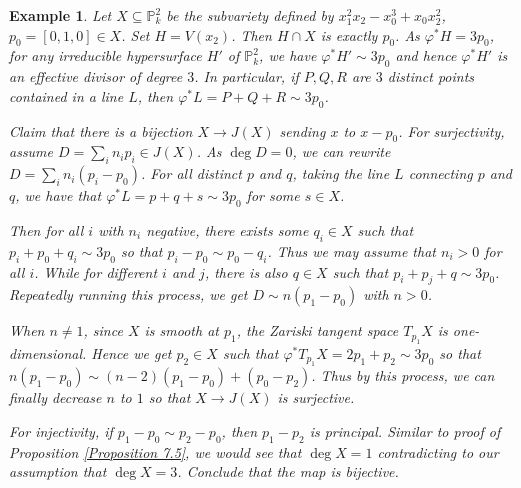 \documentclass{ctexart}
\newtheorem{example}{Example}[section]
\begin{document}
\begin{example}
    Let $X \subseteq \mathbb{P}_{k}^{2}$ be the subvariety defined by $x_{1}^{2}x_{2} - x_{0}^{3} + x_{0}x_{2}^{2}$, $p_{0} = [0, 1, 0]\in X$.
    Set $H = V(x_{2})$.
    Then $H \cap X$ is exactly $p_{0}$.
    As $\varphi^{\ast}H = 3p_{0}$, for any irreducible hypersurface $H'$ of $\mathbb{P}_{k}^{2}$, we have $\varphi^{\ast}H' \sim 3p_{0}$ and hence $\varphi^{\ast}H'$ is an effective divisor of degree $3$.
    In particular, if $P, Q, R$ are $3$ distinct points contained in a line $L$, then $\varphi^{\ast}L = P + Q + R \sim 3p_{0}$.
    \par
    Claim that there is a bijection $X \rightarrow J(X)$ sending $x$ to $x - p_{0}$.
    For surjectivity, assume $D = \sum_{i} n_{i}p_{i}\in J(X)$.
    As $\deg D = 0$, we can rewrite $D = \sum_{i} n_{i}(p_{i} - p_{0})$.
    For all distinct $p$ and $q$, taking the line $L$ connecting $p$ and $q$, we have that $\varphi^{\ast}L = p + q + s \sim 3p_{0}$ for some $s\in X$.
    \par
    Then for all $i$ with $n_{i}$ negative, there exists some $q_{i}\in X$ such that $p_{i} + p_{0} + q_{i} \sim 3p_{0}$ so that $p_{i} - p_{0} \sim p_{0} - q_{i}$.
    Thus we may assume that $n_{i} > 0$ for all $i$.
    While for different $i$ and $j$, there is also $q\in X$ such that $p_{i} + p_{j} + q \sim 3p_{0}$.
    Repeatedly running this process, we get $D \sim n(p_{1} - p_{0})$ with $n > 0$.
    \par
    When $n \neq 1$, since $X$ is smooth at $p_{1}$, the Zariski tangent space $T_{p_{1}}X$ is one-dimensional.
    Hence we get $p_{2}\in X$ such that $\varphi^{\ast}T_{p_{1}}X = 2p_{1} + p_{2} \sim 3p_{0}$ so that $n(p_{1} - p_{0}) \sim (n - 2)(p_{1} - p_{0}) + (p_{0} - p_{2})$.
    Thus by this process, we can finally decrease $n$ to $1$ so that $X \rightarrow J(X)$ is surjective.
    \par
    For injectivity, if $p_{1} - p_{0} \sim p_{2} - p_{0}$, then $p_{1} - p_{2}$ is principal.
    Similar to proof of Proposition \ref{Proposition 7.5}, we would see that $\deg X = 1$ contradicting to our assumption that $\deg X = 3$.
    Conclude that the map is bijective.
\end{example}
\end{document}
